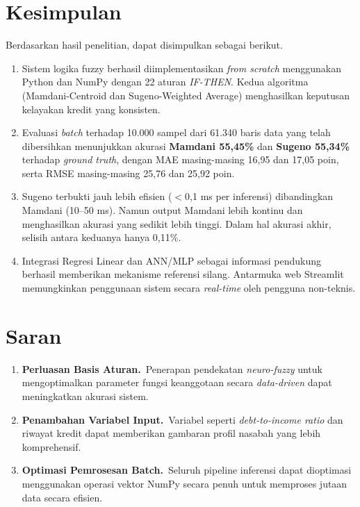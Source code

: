 \documentclass[12pt,a4paper]{report}
\begin{document}
\section{Kesimpulan}

Berdasarkan hasil penelitian, dapat disimpulkan sebagai berikut.

\begin{enumerate}[label=\arabic*.]
  \item Sistem logika fuzzy berhasil diimplementasikan
        \textit{from scratch} menggunakan Python dan NumPy
        dengan 22 aturan \textit{IF-THEN}. Kedua algoritma
        (Mamdani-Centroid dan Sugeno-Weighted Average)
        menghasilkan keputusan kelayakan kredit yang
        konsisten.

  \item Evaluasi \textit{batch} terhadap 10.000 sampel dari
        61.340 baris data yang telah dibersihkan menunjukkan
        akurasi \textbf{Mamdani 55,45\%} dan \textbf{Sugeno
        55,34\%} terhadap \textit{ground truth}, dengan MAE
        masing-masing 16,95 dan 17,05 poin, serta RMSE
        masing-masing 25,76 dan 25,92 poin.

  \item Sugeno terbukti jauh lebih efisien ($<$0{,}1 ms per
        inferensi) dibandingkan Mamdani (10--50 ms). Namun
        output Mamdani lebih kontinu dan menghasilkan akurasi
        yang sedikit lebih tinggi. Dalam hal akurasi akhir,
        selisih antara keduanya hanya 0{,}11\%.

  \item Integrasi Regresi Linear dan ANN/MLP sebagai
        informasi pendukung berhasil memberikan mekanisme
        referensi silang. Antarmuka web Streamlit memungkinkan
        penggunaan sistem secara \textit{real-time} oleh
        pengguna non-teknis.
\end{enumerate}

\section{Saran}

\begin{enumerate}[label=\arabic*.]
  \item \textbf{Perluasan Basis Aturan.}\ Penerapan pendekatan
        \textit{neuro-fuzzy} untuk mengoptimalkan parameter
        fungsi keanggotaan secara \textit{data-driven} dapat
        meningkatkan akurasi sistem.

  \item \textbf{Penambahan Variabel Input.}\ Variabel seperti
        \textit{debt-to-income ratio} dan riwayat kredit dapat
        memberikan gambaran profil nasabah yang lebih
        komprehensif.

  \item \textbf{Optimasi Pemrosesan Batch.}\ Seluruh pipeline
        inferensi dapat dioptimasi menggunakan operasi vektor
        NumPy secara penuh untuk memproses jutaan data
        secara efisien.
\end{enumerate}
\end{document}
